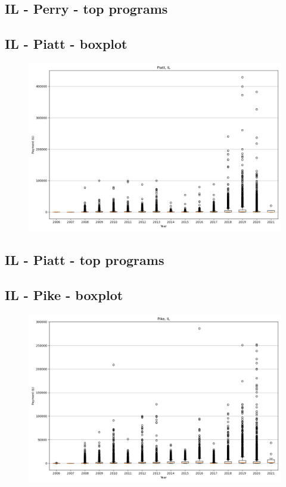 \subsection*{IL - Perry - top programs}

\newpage
\subsection*{IL - Piatt - boxplot}
\begin{figure}[h]
\centering
\includegraphics[width=7in]{../output/boxplots/counties/Piatt-IL_boxplot.png}
\end{figure}


\subsection*{IL - Piatt - top programs}

\newpage
\subsection*{IL - Pike - boxplot}
\begin{figure}[h]
\centering
\includegraphics[width=7in]{../output/boxplots/counties/Pike-IL_boxplot.png}
\end{figure}


